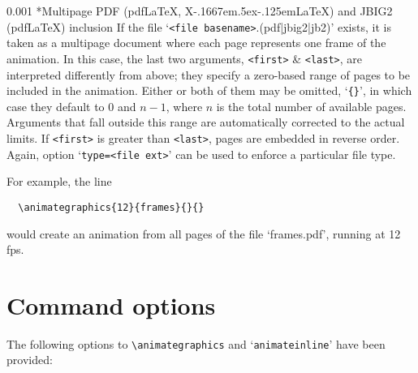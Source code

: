 \documentclass[a4paper]{article}
\makeatletter
\newcommand\myparagraph{\@startsection{paragraph}{3}{\z@}%
                                     {\parskip}%
                                     {0.001\parskip}%
                                     {\itshape\normalsize}}
\def\XeLaTeX{X\kern-.1667em\lower.5ex\hbox{\reflectbox{E}}\kern-.125em\LaTeX}
\makeatother
\begin{document}
\myparagraph*{Multipage PDF {\rm(pdf\LaTeX, \XeLaTeX)} and JBIG2 {\rm(pdf\LaTeX)} inclusion}
If the file `\verb+<file basename>+.(pdf|jbig2|jb2)' exists, it is taken as a multipage document where each page represents one frame of the animation. In this case, the last two arguments, \verb+<first>+ \& \verb+<last>+, are interpreted differently from above; they specify a zero-based range of pages to be included in the animation. Either or both of them may be omitted, `\verb+{}+', in which case they default to $0$ and $n-1$, where $n$ is the total number of available pages. Arguments that fall outside this range are automatically corrected to the actual limits. If \verb+<first>+ is greater than \verb+<last>+, pages are embedded in reverse order. Again, option `\verb+type=<file ext>+' can be used to enforce a particular file type.

For example, the line
\begin{verbatim}
  \animategraphics{12}{frames}{}{}
\end{verbatim}
would create an animation from all pages of the file `frames.pdf', running at 12 fps.

\section{Command options}
The following options to \verb+\animategraphics+ and `\verb+animateinline+' have been provided:
\end{document}
